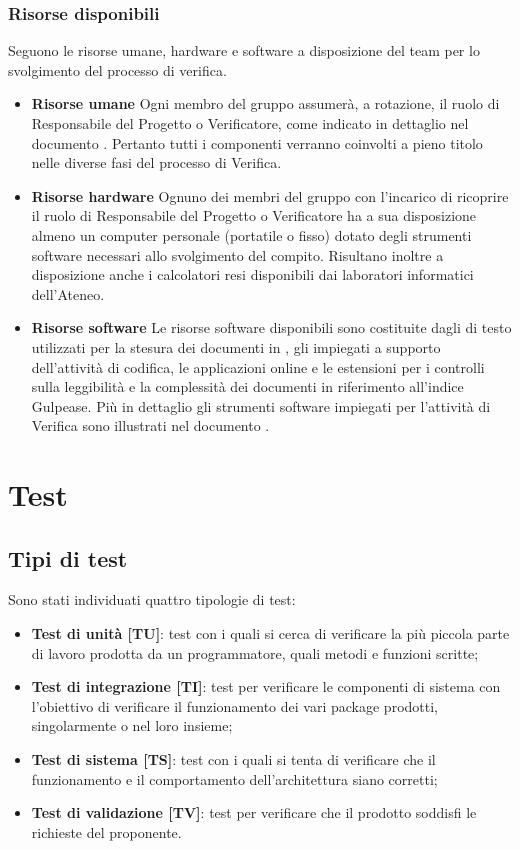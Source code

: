 		\subsubsection{Risorse disponibili}
		Seguono le risorse umane, hardware e software a disposizione del team per lo svolgimento del processo di verifica.
		\begin{itemize}
			\item \textbf{Risorse umane}
			Ogni membro del gruppo assumerà, a rotazione, il ruolo di Responsabile del Progetto o Verificatore, come indicato in dettaglio nel documento \PdP. Pertanto tutti i componenti verranno coinvolti a pieno titolo nelle diverse fasi del processo di Verifica.
			\item \textbf{Risorse hardware}
			Ognuno dei membri del gruppo con l'incarico di ricoprire il ruolo di Responsabile del Progetto o Verificatore ha a sua disposizione almeno un computer personale (portatile o fisso) dotato degli strumenti software necessari allo svolgimento del compito. Risultano inoltre a disposizione anche i calcolatori resi disponibili dai laboratori informatici dell'Ateneo.
			\item \textbf{Risorse software}
			Le risorse software disponibili sono costituite dagli  di testo utilizzati per la stesura dei documenti in , gli  impiegati a supporto dell'attività di codifica, le applicazioni online e le estensioni per i controlli sulla leggibilità e la complessità dei documenti in riferimento all'indice Gulpease. Più in dettaglio gli strumenti software impiegati per l'attività di Verifica sono illustrati nel documento \NdP.
			\end{itemize}
		


\section{Test}
	\subsection{Tipi di test}
	Sono stati individuati quattro tipologie di test:
	\begin{itemize}
		\item \textbf{Test di unità [TU]}: test con i quali si cerca di verificare la più piccola parte di lavoro prodotta da un programmatore, quali metodi e funzioni scritte;
		\item \textbf{Test di integrazione [TI]}: test per verificare le componenti di sistema con l'obiettivo di verificare il funzionamento dei vari package prodotti, singolarmente o nel loro insieme;
		\item \textbf{Test di sistema [TS]}: test con i quali si tenta di verificare che il funzionamento e il comportamento dell'architettura siano corretti;
		\item \textbf{Test di validazione [TV]}: test per verificare che il prodotto soddisfi le richieste del proponente.
	\end{itemize}

